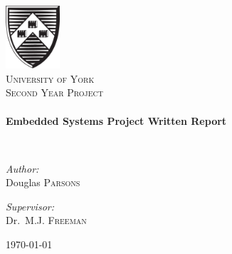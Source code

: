 \begin{titlepage}
\begin{center}

\includegraphics[width=0.15\textwidth]{./logo}~\\[1cm]

\textsc{\LARGE University of York}\\[1.5cm]

\textsc{\Large Second Year Project}\\[0.5cm]

\HRule \\[0.4cm]
{ \huge \bfseries Embedded Systems Project Written Report \\[0.4cm] }

\HRule \\[1.5cm]

\noindent
\begin{minipage}[t]{0.4\textwidth}
\begin{flushleft} \large
\emph{Author:}\\
Douglas \textsc{Parsons}
\end{flushleft}
\end{minipage}%
\begin{minipage}[t]{0.4\textwidth}
\begin{flushright} \large
\emph{Supervisor:} \\
Dr.~M.J. \textsc{Freeman}
\end{flushright}
\end{minipage}

\vfill

{\large \today}

\end{center}
\end{titlepage}
